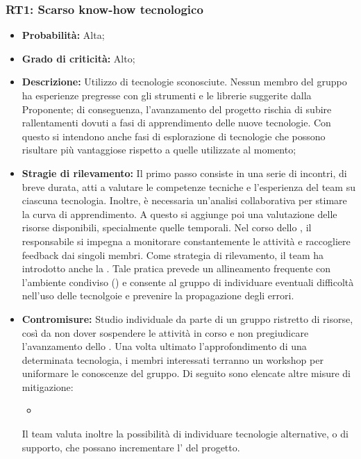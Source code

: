 \subsubsection{RT1: Scarso know-how tecnologico}
\begin{itemize}
    \item \textbf{Probabilità:} Alta;
    \item \textbf{Grado di criticità:} Alto;
    \item \textbf{Descrizione:} Utilizzo di tecnologie sconosciute. Nessun membro del gruppo ha
    esperienze pregresse con gli strumenti e le librerie suggerite dalla Proponente; di conseguenza, l’avanzamento del progetto rischia di subire rallentamenti dovuti a fasi di apprendimento delle nuove tecnologie.
    Con questo si intendono anche fasi di esplorazione di tecnologie che possono risultare più vantaggiose rispetto a quelle utilizzate al momento;
    \item \textbf{Stragie di rilevamento:} Il primo passo consiste in una serie di incontri, di breve durata, atti a valutare le competenze tecniche e l'esperienza del team su ciascuna tecnologia. Inoltre, è necessaria un'analisi collaborativa per stimare la curva di apprendimento. A questo si aggiunge poi una valutazione delle risorse disponibili, specialmente quelle temporali. Nel corso dello , il responsabile si impegna a monitorare constantemente le attività e raccogliere feedback dai singoli membri. Come strategia di rilevamento, il team ha introdotto anche la . Tale pratica prevede un allineamento frequente con l'ambiente condiviso () e consente al gruppo di individuare eventuali difficoltà nell'uso delle tecnolgoie e prevenire la propagazione degli errori. 
    \item \textbf{Contromisure:} Studio individuale da parte di un gruppo ristretto di risorse, così da non dover sospendere le attività in corso e non pregiudicare l'avanzamento dello . Una volta ultimato l'approfondimento di una determinata tecnologia, i membri interessati terranno un workshop per uniformare le conoscenze del gruppo. Di seguito sono elencate altre misure di mitigazione:
    \begin{itemize}
        \item 
    \end{itemize}
    \par Il team valuta inoltre la possibilità di individuare tecnologie alternative, o di supporto, che possano incrementare l' del progetto.
\end{itemize}
